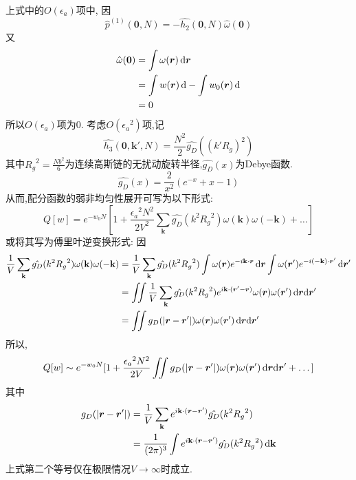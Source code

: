 上式中的$O(\epsilon_a)$项中,
因$$\hat{p}^{(1)}(\mathbf{0},N) = -\hat{h_2}(\mathbf{0},N) \hat{\omega}(\mathbf{0})$$
又
$$
\begin{aligned}
	\hat{\omega}(\mathbf{0}) &= \int \omega(\bm{r} )\,\mathrm{d}{\bm{r} } \\
	&= \int w(\bm{r} )\,\mathrm{d}-\int {w_0}(\bm{r} )\,\mathrm{d} \\
	&= 0
\end{aligned}
$$
所以$O(\epsilon_a)$项为0.
考虑$O({\epsilon_a}^2)$项,记
\begin{equation}
\hat{h_3}(\mathbf{0},\mathbf{k}',N) = \frac{N^2}{2} \hat{g_D}((k' R_g)^2)
\end{equation}
其中${R_g}^2 = \frac{N b^2}{6}$为连续高斯链的无扰动旋转半径,$\hat{g_D}(x)$为Debye函数.
\begin{equation}
\hat{g_D}(x) = \frac{2}{x^2}(e^{-x}+x-1)
\end{equation}
从而,配分函数的弱非均匀性展开可写为以下形式:
\begin{equation}
Q[w] = e^{-w_0 N}[1+\frac{{\epsilon_a}^2 N^2}{2 V^2} \sum_{\mathbf{k}} \hat{g_D}(k^2 {R_g}^2) \omega(\mathbf{k}) \omega(-\mathbf{k})+\dots]
\end{equation}
或将其写为傅里叶逆变换形式:
因
$$
\begin{aligned}
\frac{1}{V} \sum_{\mathbf{k}} \hat{g_D}(k^2 {R_g}^2) \omega(\mathbf{k}) \omega(-\mathbf{k}) &= \frac{1}{V} \sum_{\mathbf{k}} \hat{g_D}(k^2 {R_g}^2) \int \omega(\bm{r} ) e^{-i \mathbf{k} \cdot \bm{r} }\,\mathrm{d} \bm{r}  \int \omega(\bm{r} ') e^{-i (-\mathbf{k}) \cdot \bm{r} '}\,\mathrm{d} \bm{r} ' \\ 
 &= \iint \frac{1}{V} \sum_{\mathbf{k}} \hat{g_D}(k^2 {R_g}^2) e^{i\mathbf{k} \cdot (\bm{r} '-\bm{r} )} \omega(\bm{r} ) \omega(\bm{r} ')\,\mathrm{d} \bm{r}  \mathrm{d} \bm{r} '\\
 &= \iint g_D(|\bm{r} -\bm{r} '|) \omega(\bm{r} ) \omega(\bm{r} ')\,\mathrm{d} \bm{r}  \mathrm{d} \bm{r} '
\end{aligned}
$$
所以,
\begin{equation}
Q[w] \sim e^{-w_0 N}[1+\frac{{\epsilon_a}^2 N^2}{2 V}\iint g_D(|\bm{r} -\bm{r} '|) \omega(\bm{r} ) \omega(\bm{r} ')\,\mathrm{d} \bm{r}  \mathrm{d} \bm{r} '+\dots] \label{3.132}
\end{equation}
其中
\begin{equation}
\begin{aligned}
g_D(|\bm{r} -\bm{r} '|) &= \frac{1}{V}\sum_{\mathbf{k}}e^{i\mathbf{k} \cdot (\bm{r} -\bm{r} ')} \hat{g_D}(k^2 {R_g}^2)\\
 &= \frac{1}{(2\pi)^3} \int e^{i\mathbf{k} \cdot (\bm{r} -\bm{r} ')} \hat{g_D}(k^2 {R_g}^2)\,\mathrm{d} \mathbf{k}
\end{aligned}
\label{3.133}
\end{equation}
上式第二个等号仅在极限情况$V \rightarrow \infty $时成立.

